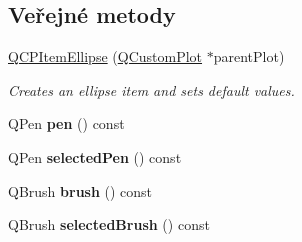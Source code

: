 \subsection*{Veřejné metody}
\begin{DoxyCompactItemize}
\item 
\hyperlink{classQCPItemEllipse_a759b77ef002515eba0263b5447ecb3fb}{Q\+C\+P\+Item\+Ellipse} (\hyperlink{classQCustomPlot}{Q\+Custom\+Plot} $\ast$parent\+Plot)
\begin{DoxyCompactList}\small\item\em Creates an ellipse item and sets default values. \end{DoxyCompactList}\item 
\hypertarget{classQCPItemEllipse_adb67471eabaf1214c99767f1653ca0ed}{}Q\+Pen {\bfseries pen} () const \label{classQCPItemEllipse_adb67471eabaf1214c99767f1653ca0ed}

\item 
\hypertarget{classQCPItemEllipse_ac52ab52225d238365ff3264b4b69130f}{}Q\+Pen {\bfseries selected\+Pen} () const \label{classQCPItemEllipse_ac52ab52225d238365ff3264b4b69130f}

\item 
\hypertarget{classQCPItemEllipse_ac012e4fd59fdb1afb6554937bae8f7e1}{}Q\+Brush {\bfseries brush} () const \label{classQCPItemEllipse_ac012e4fd59fdb1afb6554937bae8f7e1}

\item 
\hypertarget{classQCPItemEllipse_a0043e401a912d54ea3195bab0967b394}{}Q\+Brush {\bfseries selected\+Brush} () const \label{classQCPItemEllipse_a0043e401a912d54ea3195bab0967b394}


\end{DoxyCompactItemize}
